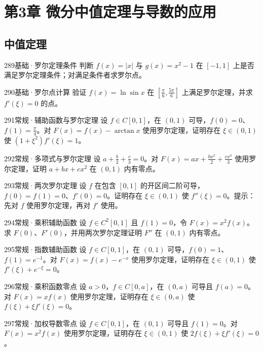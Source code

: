 \section{第3章 微分中值定理与导数的应用}
\subsection{中值定理}
\begin{exercise}{289}{基础·罗尔定理条件}
判断 $f(x)=|x|$ 与 $g(x)=x^2-1$ 在 $[-1,1]$ 上是否满足罗尔定理条件；对满足条件者求罗尔点。
\end{exercise}
\begin{exercise}{290}{基础·罗尔点计算}
验证 $f(x)=\ln\sin x$ 在 $[\frac{\pi}{6},\frac{5\pi}{6}]$ 上满足罗尔定理，并求 $f'(\xi)=0$ 的点。
\end{exercise}
\begin{exercise}{291}{常规·辅助函数与罗尔定理}
设 $f\in C[0,1]$，在 $(0,1)$ 可导，$f(0)=0$、$f(1)=\frac{\pi}{4}$。对 $F(x)=f(x)-\arctan x$ 使用罗尔定理，证明存在 $\xi\in(0,1)$ 使 $(1+\xi^2)f'(\xi)=1$。
\end{exercise}
\begin{exercise}{292}{常规·多项式与罗尔定理}
设 $a+\frac{b}{2}+\frac{c}{3}=0$。对 $F(x)=ax+\frac{bx^2}{2}+\frac{cx^3}{3}$ 使用罗尔定理，证明 $a+bx+cx^2$ 在 $(0,1)$ 内有零点。
\end{exercise}
\begin{exercise}{293}{常规·两次罗尔定理}
设 $f$ 在包含 $[0,1]$ 的开区间二阶可导，$f(0)=f(1)=0$、$f'(0)=0$。证明存在 $\xi\in(0,1)$ 使 $f''(\xi)=0$。提示：先对 $f$ 使用罗尔定理，再对 $f'$ 使用。
\end{exercise}
\begin{exercise}{294}{常规·乘积辅助函数}
设 $f\in C^2[0,1]$ 且 $f(1)=0$，令 $F(x)=x^2f(x)$。求 $F(0)$、$F'(0)$，并用两次罗尔定理证明 $F''$ 在 $(0,1)$ 内有零点。
\end{exercise}
\begin{exercise}{295}{常规·指数辅助函数}
设 $f\in C[0,1]$，在 $(0,1)$ 可导，$f(0)=1$、$f(1)=e^{-1}$。对 $F(x)=f(x)-e^{-x}$ 使用罗尔定理，证明存在 $\xi\in(0,1)$ 使 $f'(\xi)+e^{-\xi}=0$。
\end{exercise}
\begin{exercise}{296}{常规·乘积函数零点}
设 $a>0$，$f\in C[0,a]$，在 $(0,a)$ 可导且 $f(a)=0$。对 $F(x)=xf(x)$ 使用罗尔定理，证明存在 $\xi\in(0,a)$ 使 $f(\xi)+\xi f'(\xi)=0$。
\end{exercise}
\begin{exercise}{297}{常规·加权导数零点}
设 $f\in C[0,1]$，在 $(0,1)$ 可导且 $f(1)=0$。对 $F(x)=x^2f(x)$ 使用罗尔定理，证明存在 $\xi\in(0,1)$ 使 $2f(\xi)+\xi f'(\xi)=0$。
\end{exercise}
